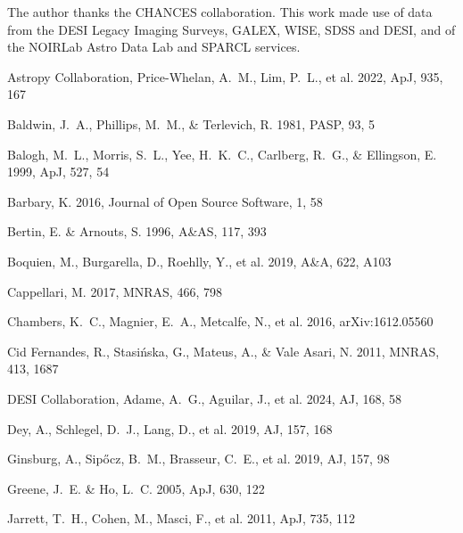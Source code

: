 \documentclass{aa}
\begin{document}
\begin{acknowledgements}
The author thanks the CHANCES collaboration. This work made use of data
from the DESI Legacy Imaging Surveys, GALEX, WISE, SDSS and DESI, and of
the NOIRLab Astro Data Lab and SPARCL services.
\end{acknowledgements}

\begin{thebibliography}{}

Astropy Collaboration, Price-Whelan, A.~M., Lim, P.~L., et al. 2022,
ApJ, 935, 167

Baldwin, J.~A., Phillips, M.~M., \& Terlevich, R. 1981, PASP, 93, 5

Balogh, M.~L., Morris, S.~L., Yee, H.~K.~C., Carlberg, R.~G., \&
Ellingson, E. 1999, ApJ, 527, 54

Barbary, K. 2016, Journal of Open Source Software, 1, 58

Bertin, E. \& Arnouts, S. 1996, A\&AS, 117, 393

Boquien, M., Burgarella, D., Roehlly, Y., et al. 2019, A\&A, 622, A103

Cappellari, M. 2017, MNRAS, 466, 798

Chambers, K.~C., Magnier, E.~A., Metcalfe, N., et al. 2016, arXiv:1612.05560

Cid Fernandes, R., Stasi\'nska, G., Mateus, A., \& Vale Asari, N. 2011,
MNRAS, 413, 1687

DESI Collaboration, Adame, A.~G., Aguilar, J., et al. 2024, AJ, 168, 58

Dey, A., Schlegel, D.~J., Lang, D., et al. 2019, AJ, 157, 168

Ginsburg, A., Sip\H{o}cz, B.~M., Brasseur, C.~E., et al. 2019, AJ, 157, 98

Greene, J.~E. \& Ho, L.~C. 2005, ApJ, 630, 122

Jarrett, T.~H., Cohen, M., Masci, F., et al. 2011, ApJ, 735, 112


\end{thebibliography}
\end{document}
